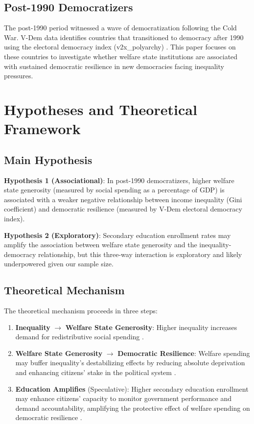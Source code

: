 \documentclass[11pt,letterpaper]{article}
\begin{document}
\subsection{Post-1990 Democratizers}

The post-1990 period witnessed a wave of democratization following the Cold War. V-Dem data identifies countries that transitioned to democracy after 1990 using the electoral democracy index (v2x\_polyarchy) \cite{Coppedge2024}. This paper focuses on these countries to investigate whether welfare state institutions are associated with sustained democratic resilience in new democracies facing inequality pressures.

\section{Hypotheses and Theoretical Framework}

\subsection{Main Hypothesis}

\textbf{Hypothesis 1 (Associational)}: In post-1990 democratizers, higher welfare state generosity (measured by social spending as a percentage of GDP) is associated with a weaker negative relationship between income inequality (Gini coefficient) and democratic resilience (measured by V-Dem electoral democracy index).

\textbf{Hypothesis 2 (Exploratory)}: Secondary education enrollment rates may amplify the association between welfare state generosity and the inequality-democracy relationship, but this three-way interaction is exploratory and likely underpowered given our sample size.

\subsection{Theoretical Mechanism}

The theoretical mechanism proceeds in three steps:

\begin{enumerate}
  \item \textbf{Inequality} $\rightarrow$ \textbf{Welfare State Generosity}: Higher inequality increases demand for redistributive social spending \cite{Acemoglu2019}.

  \item \textbf{Welfare State Generosity} $\rightarrow$ \textbf{Democratic Resilience}: Welfare spending may buffer inequality's destabilizing effects by reducing absolute deprivation and enhancing citizens' stake in the political system \cite{Huber2019}.

  \item \textbf{Education Amplifies} (Speculative): Higher secondary education enrollment may enhance citizens' capacity to monitor government performance and demand accountability, amplifying the protective effect of welfare spending on democratic resilience \cite{Huber2019}.
\end{enumerate}
\end{document}
